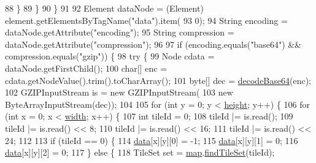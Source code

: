 \begin{DoxyCode}
88                 \}
89             \}
90         \}
91 
92         Element dataNode = (Element) element.getElementsByTagName(\textcolor{stringliteral}{"data"}).item(
93                 0);
94         String encoding = dataNode.getAttribute(\textcolor{stringliteral}{"encoding"});
95         String compression = dataNode.getAttribute(\textcolor{stringliteral}{"compression"});
96 
97         \textcolor{keywordflow}{if} (encoding.equals(\textcolor{stringliteral}{"base64"}) && compression.equals(\textcolor{stringliteral}{"gzip"})) \{
98             \textcolor{keywordflow}{try} \{
99                 Node cdata = dataNode.getFirstChild();
100                 \textcolor{keywordtype}{char}[] enc = cdata.getNodeValue().trim().toCharArray();
101                 byte[] dec = \mbox{\hyperlink{classorg_1_1newdawn_1_1slick_1_1tiled_1_1_layer_af31e22c2a21a77e000afee8a40393019}{decodeBase64}}(enc);
102                 GZIPInputStream is = \textcolor{keyword}{new} GZIPInputStream(
103                         \textcolor{keyword}{new} ByteArrayInputStream(dec));
104 
105                 \textcolor{keywordflow}{for} (\textcolor{keywordtype}{int} y = 0; y < \mbox{\hyperlink{classorg_1_1newdawn_1_1slick_1_1tiled_1_1_layer_acf0299abe971ba325493fd8031db08be}{height}}; y++) \{
106                     \textcolor{keywordflow}{for} (\textcolor{keywordtype}{int} x = 0; x < \mbox{\hyperlink{classorg_1_1newdawn_1_1slick_1_1tiled_1_1_layer_a901731d81cc624050ffefd1af9d09119}{width}}; x++) \{
107                         \textcolor{keywordtype}{int} tileId = 0;
108                         tileId |= is.read();
109                         tileId |= is.read() << 8;
110                         tileId |= is.read() << 16;
111                         tileId |= is.read() << 24;
112 
113                         \textcolor{keywordflow}{if} (tileId == 0) \{
114                             \mbox{\hyperlink{classorg_1_1newdawn_1_1slick_1_1tiled_1_1_layer_a9370f031c215f22f2b18135d8ca5cbc8}{data}}[x][y][0] = -1;
115                             \mbox{\hyperlink{classorg_1_1newdawn_1_1slick_1_1tiled_1_1_layer_a9370f031c215f22f2b18135d8ca5cbc8}{data}}[x][y][1] = 0;
116                             \mbox{\hyperlink{classorg_1_1newdawn_1_1slick_1_1tiled_1_1_layer_a9370f031c215f22f2b18135d8ca5cbc8}{data}}[x][y][2] = 0;
117                         \} \textcolor{keywordflow}{else} \{
118                             TileSet \textcolor{keyword}{set} = \mbox{\hyperlink{classorg_1_1newdawn_1_1slick_1_1tiled_1_1_layer_ad6494d6da75ffb77cacdec8d38d74982}{map}}.\mbox{\hyperlink{classorg_1_1newdawn_1_1slick_1_1tiled_1_1_tiled_map_a136e9d5ff92016dcfaf8effa027147a2}{findTileSet}}(tileId);

\end{DoxyCode}

